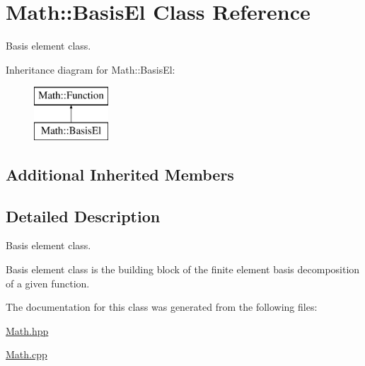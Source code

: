 \hypertarget{class_math_1_1_basis_el}{}\section{Math\+:\+:Basis\+El Class Reference}
\label{class_math_1_1_basis_el}


Basis element class.  


Inheritance diagram for Math\+:\+:Basis\+El\+:\begin{figure}[H]
\begin{center}
\leavevmode
\includegraphics[height=2.000000cm]{class_math_1_1_basis_el}
\end{center}
\end{figure}
\subsection*{Additional Inherited Members}


\subsection{Detailed Description}
Basis element class. 

Basis element class is the building block of the finite element basis decomposition of a given function. 

The documentation for this class was generated from the following files\+:\begin{DoxyCompactItemize}
\item 
\mbox{\hyperlink{_math_8hpp}{Math.\+hpp}}\item 
\mbox{\hyperlink{_math_8cpp}{Math.\+cpp}}\end{DoxyCompactItemize}

